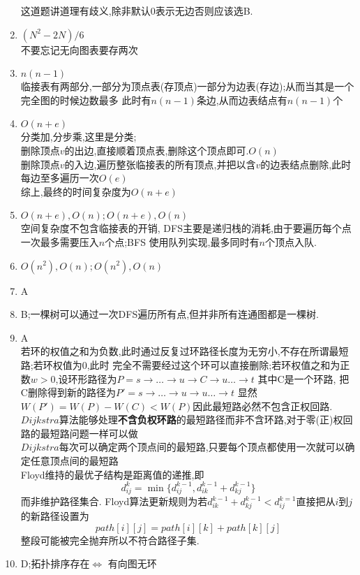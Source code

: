 \documentclass[12pt, a4paper, oneside, UTF8]{ctexbook}
\begin{document}
\begin{enumerate}
    这道题讲道理有歧义,除非默认$0$表示无边否则应该选B. 
    \item $(N^2-2N)/6$ \\
    不要忘记无向图表要存两次 
    \item $n(n-1)$ \\
    临接表有两部分,一部分为顶点表(存顶点)一部分为边表(存边);从而当其是一个完全图的时候边数最多
    此时有$n(n-1)$条边,从而边表结点有$n(n-1)$个
    \item $O(n+e)$ \\
    分类加,分步乘,这里是分类;  \\
    删除顶点$v$的出边,直接顺着顶点表,删除这个顶点即可.$O(n)$ \\
    删除顶点$v$的入边,遍历整张临接表的所有顶点,并把以含$v$的边表结点删除,此时每边至多遍历一次$O(e)$ \\
    综上,最终的时间复杂度为$O(n+e)$
    \item $O(n+e),O(n);O(n+e),O(n)$ \\
    空间复杂度不包含临接表的开销, DFS主要是递归栈的消耗,由于要遍历每个点一次最多需要压入$n$个点;BFS
    使用队列实现,最多同时有$n$个顶点入队. 
    \item $O(n^2),O(n);O(n^2),O(n)$ 
    \item A 
    \item B;一棵树可以通过一次DFS遍历所有点,但并非所有连通图都是一棵树.
    \item A \\
    若环的权值之和为负数,此时通过反复过环路径长度为无穷小,不存在所谓最短路;若环权值为0,此时
    完全不需要经过这个环可以直接删除;若环权值之和为正数$w>0$,设环形路径为$P=s\rightarrow
    \ldots\rightarrow u\rightarrow C\rightarrow u\ldots\rightarrow t$ 其中C是一个环路,
    把C删除得到新的路径为$P'=s\rightarrow\ldots\rightarrow u\rightarrow u\ldots\rightarrow t$
    显然$W(P')=W(P)-W(C)<W(P)$因此最短路必然不包含正权回路.  \\
    $Dijkstra$算法能够处理\textbf{不含负权环路}的最短路径而非不含环路,对于零(正)权回路的最短路问题一样可以做 \\
    $Dijkstra$每次可以确定两个顶点间的最短路,只要每个顶点都使用一次就可以确定任意顶点间的最短路 \\
    Floyd维持的最优子结构是距离值的递推,即
    $$
    d_{ij}^{k} = \min\{d_{ij}^{k-1},d_{ik}^{k-1}+d_{kj}^{k-1}\}
    $$
    而非维护路径集合. Floyd算法更新规则为若$d_{ik}^{k-1}+d_{kj}^{k-1}<d_{ij}^{k=1}$直接把从$i$到$j$的新路径设置为
    $$
    path[i][j]=path[i][k]+path[k][j] 
    $$
    整段可能被完全抛弃所以不符合路径子集.
    \item D;拓扑排序存在$\iff$ 有向图无环

\end{enumerate}
\end{document}
